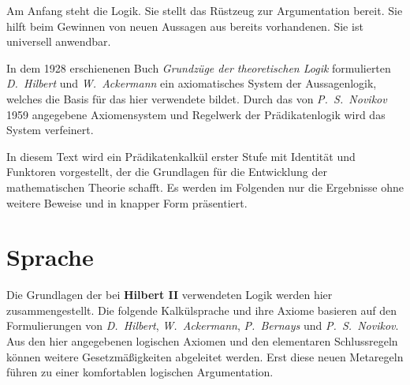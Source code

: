 \documentclass[a4paper,german,10pt,twoside]{book}
\theoremstyle{definition}
\theoremstyle{remark}
\begin{document}
\par
Am Anfang steht die Logik. Sie stellt das R{\"u}stzeug zur Argumentation bereit. 
Sie hilft beim Gewinnen von neuen Aussagen aus bereits vorhandenen. 
Sie ist universell anwendbar. 

\par
In dem 1928 erschienenen Buch \emph{Grundz{\"u}ge der theoretischen Logik} 
formulierten \emph{D.~Hilbert} und \emph{W.~Ackermann} ein 
axiomatisches System der Aussagenlogik, welches die Basis f{\"u}r 
das hier verwendete bildet. Durch das von \emph{P.~S.~Novikov} 1959 
angegebene Axiomensystem und Regelwerk der Pr{\"a}dikatenlogik wird das 
System verfeinert.

\par
In diesem Text wird ein Pr{\"a}dikatenkalk{\"u}l erster Stufe mit Identit{\"a}t 
und Funktoren vorgestellt, der die Grundlagen f{\"u}r die Entwicklung 
der mathematischen Theorie schafft. Es werden im Folgenden  nur die 
Ergebnisse ohne weitere Beweise und in knapper Form pr{\"a}sentiert.


\chapter{Sprache} \label{chapter3} \hypertarget{chapter3}{}

Die Grundlagen der bei \textbf{Hilbert II} verwendeten Logik werden hier
zusammengestellt. Die folgende Kalk{\"u}lsprache und ihre Axiome basieren 
auf den Formulierungen von \emph{D.~Hilbert}, \emph{W.~Ackermann}, 
\emph{P.~Bernays} und \emph{P.~S.~Novikov}. Aus den hier angegebenen 
logischen Axiomen und den elementaren Schlussregeln k{\"o}nnen weitere 
Gesetzm{\"a}{\ss}igkeiten abgeleitet werden. Erst diese neuen Metaregeln f{\"u}hren 
zu einer komfortablen logischen Argumentation.
\end{document}
